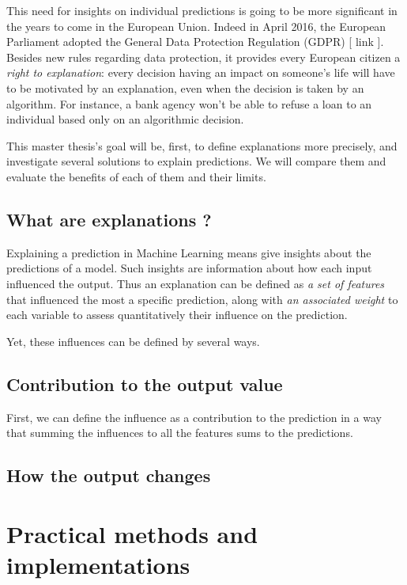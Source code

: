 \documentclass[a4paper,11pt]{kth-mag}
\begin{document}
This need for insights on individual predictions is going to be more significant in the years to come in the European Union. Indeed in April 2016, the European Parliament adopted the General Data Protection Regulation (GDPR) [  link  ]. Besides new rules regarding data protection, it provides every European citizen a \textit{right to explanation}: every decision having an impact on someone's life will have to be motivated by an explanation, even when the decision is taken by an algorithm. For instance, a bank agency won't be able to refuse a loan to an individual based only on an algorithmic decision.

 This master thesis's goal will be, first, to define explanations more precisely, and investigate several solutions to explain predictions. We will compare them and evaluate the benefits of each of them and their limits.

\section{What are explanations ?}

Explaining a prediction in Machine Learning means give insights about the predictions of a model. Such insights are information about how each input influenced the output. Thus an explanation can be defined as \textit{a set of features} that influenced the most a specific prediction, along with \textit{an associated weight} to each variable to assess quantitatively their influence on the prediction.

Yet, these influences can be defined by several ways.

\section{Contribution to the output value}

First, we can define the influence as a contribution to the prediction in a way that summing the influences to all the features sums to the predictions.

\section{How the output changes}

\chapter{Practical methods and implementations}
\end{document}
